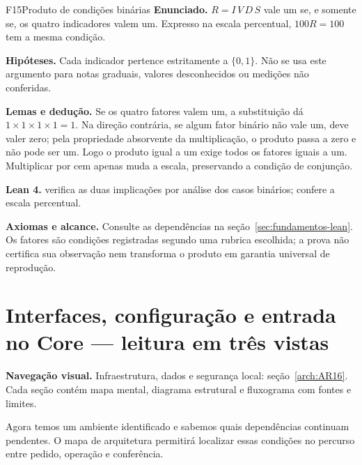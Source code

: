 \begin{formalizacao}{F15}{Produto de condições binárias}
\textbf{Enunciado.} $R=I\,V\,D\,S$ vale um se, e somente se, os quatro indicadores valem um. Expresso na escala percentual, $100R=100$ tem a mesma condição.

\textbf{Hipóteses.} Cada indicador pertence estritamente a $\{0,1\}$. Não se usa este argumento para notas graduais, valores desconhecidos ou medições não conferidas.

\textbf{Lemas e dedução.} Se os quatro fatores valem um, a substituição dá $1\times1\times1\times1=1$. Na direção contrária, se algum fator binário não vale um, deve valer zero; pela propriedade absorvente da multiplicação, o produto passa a zero e não pode ser um. Logo o produto igual a um exige todos os fatores iguais a um. Multiplicar por cem apenas muda a escala, preservando a condição de conjunção.

\textbf{Lean 4.}  verifica as duas implicações por análise dos casos binários;  confere a escala percentual.

\textbf{Axiomas e alcance.} Consulte as dependências na seção~\ref{sec:fundamentos-lean}. Os fatores são condições registradas segundo uma rubrica escolhida; a prova não certifica sua observação nem transforma o produto em garantia universal de reprodução.
\end{formalizacao}


\clearpage\section{Interfaces, configuração e entrada no Core — leitura em três vistas}\label{arch:AR01}




\begin{descricao}\textbf{Navegação visual.} Infraestrutura, dados e segurança local: seção~\ref{arch:AR16}. Cada seção contém mapa mental, diagrama estrutural e fluxograma com fontes e limites.\end{descricao}


Agora temos um ambiente identificado e sabemos quais dependências continuam pendentes. O mapa de arquitetura permitirá localizar essas condições no percurso entre pedido, operação e conferência.
